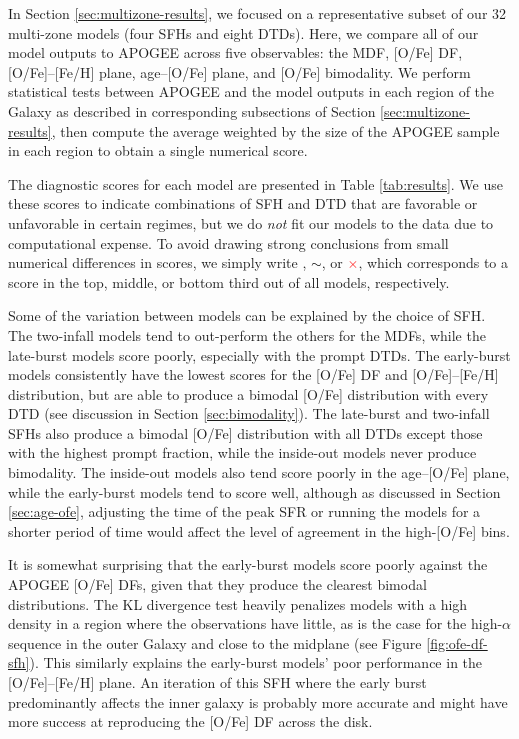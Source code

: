 \documentclass[twocolumn,twocolappendix,linenumbers]{aastex631}
\newcommand{\yes}{\textcolor{green}{\checkmark}\xspace}
\newcommand{\meh}{\textcolor{black}{$\sim$}\xspace}
\newcommand{\no}{\textcolor{red}{$\times$}\xspace}
\begin{document}
In Section \ref{sec:multizone-results}, we focused on a representative subset of our 32 multi-zone models (four SFHs and eight DTDs). Here, we compare all of our model outputs to APOGEE across five observables: the MDF, [O/Fe] DF, [O/Fe]--[Fe/H] plane, age--[O/Fe] plane, and [O/Fe] bimodality. We perform statistical tests between APOGEE and the model outputs in each region of the Galaxy as described in corresponding subsections of Section \ref{sec:multizone-results}, then compute the average weighted by the size of the APOGEE sample in each region to obtain a single numerical score.

The diagnostic scores for each model are presented in Table \ref{tab:results}. We use these scores to indicate combinations of SFH and DTD that are favorable or unfavorable in certain regimes, but we do {\it not} fit our models to the data due to computational expense. To avoid drawing strong conclusions from small numerical differences in scores, we simply write \yes, \meh, or \no, which corresponds to a score in the top, middle, or bottom third out of all models, respectively.

Some of the variation between models can be explained by the choice of SFH. The two-infall models tend to out-perform the others for the MDFs, while the late-burst models score poorly, especially with the prompt DTDs. The early-burst models consistently have the lowest scores for the [O/Fe] DF and [O/Fe]--[Fe/H] distribution, but are able to produce a bimodal [O/Fe] distribution with every DTD (see discussion in Section \ref{sec:bimodality}). The late-burst and two-infall SFHs also produce a bimodal [O/Fe] distribution with all DTDs except those with the highest prompt fraction, while the inside-out models never produce bimodality. The inside-out models also tend score poorly in the age--[O/Fe] plane, while the early-burst models tend to score well, although as discussed in Section \ref{sec:age-ofe}, adjusting the time of the peak SFR or running the models for a shorter period of time would affect the level of agreement in the high-[O/Fe] bins.

It is somewhat surprising that the early-burst models score poorly against the APOGEE [O/Fe] DFs, given that they produce the clearest bimodal distributions. The KL divergence test heavily penalizes models with a high density in a region where the observations have little, as is the case for the high-$\alpha$ sequence in the outer Galaxy and close to the midplane (see Figure \ref{fig:ofe-df-sfh}). This similarly explains the early-burst models' poor performance in the [O/Fe]--[Fe/H] plane. An iteration of this SFH where the early burst predominantly affects the inner galaxy is probably more accurate and might have more success at reproducing the [O/Fe] DF across the disk.
\end{document}
